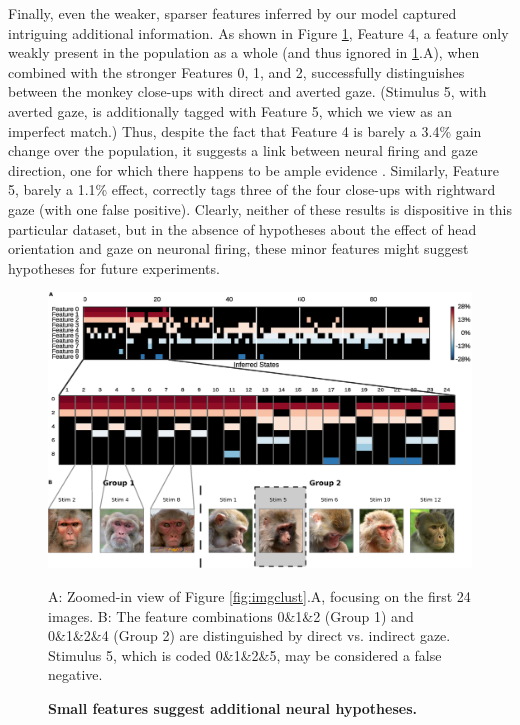 \documentclass[10pt,letterpaper]{article}
\begin{document}
Finally, even the weaker, sparser features inferred by our model captured intriguing additional information. As shown in Figure \ref{fig:imgclust_sub}, Feature 4, a feature only weakly present in the population as a whole (and thus ignored in \ref{fig:imgclust_sub}.A), when combined with the stronger Features 0, 1, and 2, successfully distinguishes between the monkey close-ups with direct and averted gaze. (Stimulus 5, with averted gaze, is additionally tagged with Feature 5, which we view as an imperfect match.) Thus, despite the fact that Feature 4 is barely a 3.4\% gain change over the population, it suggests a link between neural firing and gaze direction, one for which there happens to be ample evidence \cite{Perrett23, Freiwald845}. Similarly, Feature 5, barely a 1.1\% effect, correctly tags three of the four close-ups with rightward gaze (with one false positive). Clearly, neither of these results is dispositive in this particular dataset, but in the absence of hypotheses about the effect of head orientation and gaze on neuronal firing, these minor features might suggest hypotheses for future experiments.

\begin{figure}[!h]
    \includegraphics[width=\linewidth]{imgclust_sub}
	\caption{\bf Small features suggest additional neural hypotheses.}
	A: Zoomed-in view of Figure \ref{fig:imgclust}.A, focusing on the first 24 images. B: The feature combinations 0\&1\&2 (Group 1) and 0\&1\&2\&4 (Group 2) are distinguished by direct vs. indirect gaze. Stimulus 5, which is coded 0\&1\&2\&5, may be considered a false negative.
	\label{fig:imgclust_sub}
\end{figure}
\end{document}
